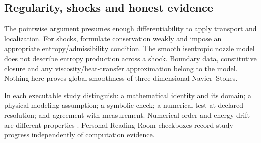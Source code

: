 \subsection{Regularity, shocks and honest evidence}
The pointwise argument presumes enough differentiability to apply transport
and localization. For shocks, formulate conservation weakly and impose an
appropriate entropy/admissibility condition. The smooth isentropic nozzle model
does not describe entropy production across a shock. Boundary data, constitutive
closure and any viscosity/heat-transfer approximation belong to the model.
Nothing here proves global smoothness of three-dimensional Navier--Stokes.

In each executable study distinguish: a mathematical identity and its domain;
a physical modeling assumption; a symbolic check; a numerical test at declared
resolution; and agreement with measurement. Numerical order and energy drift
are different properties \cite[Chapter 17]{nr}. Personal Reading Room checkboxes
record study progress independently of computation evidence.
